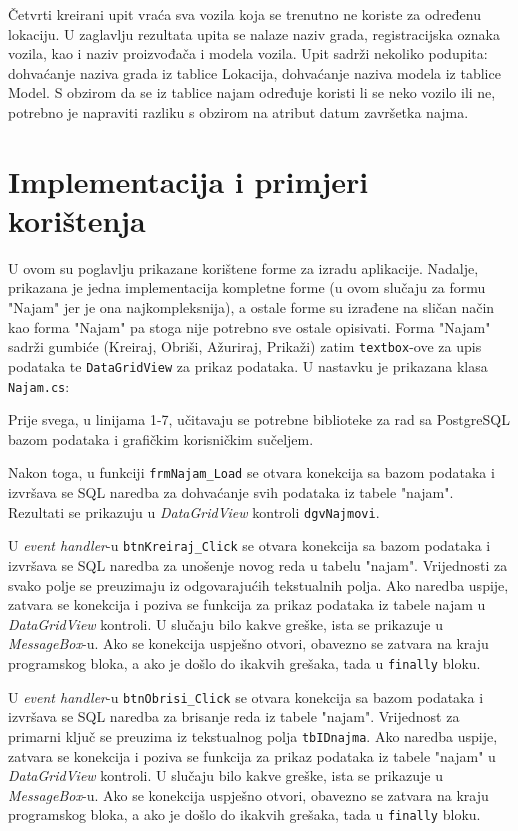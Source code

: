 \documentclass[]{foi} %
\begin{document}
Četvrti kreirani upit vraća sva vozila koja se trenutno ne koriste za određenu lokaciju. U zaglavlju rezultata upita se nalaze naziv grada, registracijska oznaka vozila, kao i naziv proizvođača i modela vozila. Upit sadrži nekoliko podupita: dohvaćanje naziva grada iz tablice Lokacija, dohvaćanje naziva modela iz tablice Model. S obzirom da se iz tablice najam određuje koristi li se neko vozilo ili ne, potrebno je napraviti razliku s obzirom na atribut datum završetka najma.

\chapter{Implementacija i primjeri korištenja}

U ovom su poglavlju prikazane korištene forme za izradu aplikacije. Nadalje, prikazana je jedna implementacija kompletne forme (u ovom slučaju za formu "Najam" jer je ona najkompleksnija), a ostale forme su izrađene na sličan način kao forma "Najam" pa stoga nije potrebno sve ostale opisivati. Forma "Najam" sadrži gumbiće (Kreiraj, Obriši, Ažuriraj, Prikaži) zatim \texttt{textbox}-ove za upis podataka te \texttt{DataGridView} za prikaz podataka. U nastavku je prikazana klasa \texttt{Najam.cs}:
\vspace{5mm}

Prije svega, u linijama 1-7, učitavaju se potrebne biblioteke za rad sa PostgreSQL bazom podataka i grafičkim korisničkim sučeljem.

Nakon toga, u funkciji \texttt{frmNajam\_Load} se otvara konekcija sa bazom podataka i izvršava se SQL naredba za dohvaćanje svih podataka iz tabele "najam". Rezultati se prikazuju u \textit{DataGridView} kontroli \texttt{dgvNajmovi}.

U \textit{event handler}-u \texttt{btnKreiraj\_Click} se otvara konekcija sa bazom podataka i izvršava se SQL naredba za unošenje novog reda u tabelu "najam". Vrijednosti za svako polje se preuzimaju iz odgovarajućih tekstualnih polja. Ako naredba uspije, zatvara se konekcija i poziva se funkcija za prikaz podataka iz tabele najam u \textit{DataGridView} kontroli. U slučaju bilo kakve greške, ista se prikazuje u \textit{MessageBox}-u. Ako se konekcija uspješno otvori, obavezno se zatvara na kraju programskog bloka, a ako je došlo do ikakvih grešaka, tada u \texttt{finally} bloku.

U \textit{event handler}-u \texttt{btnObrisi\_Click} se otvara konekcija sa bazom podataka i izvršava se SQL naredba za brisanje reda iz tabele "najam". Vrijednost za primarni ključ se preuzima iz tekstualnog polja \texttt{tbIDnajma}. Ako naredba uspije, zatvara se konekcija i poziva se funkcija za prikaz podataka iz tabele "najam" u \textit{DataGridView} kontroli. U slučaju bilo kakve greške, ista se prikazuje u \textit{MessageBox}-u. Ako se konekcija uspješno otvori, obavezno se zatvara na kraju programskog bloka, a ako je došlo do ikakvih grešaka, tada u \texttt{finally} bloku.
\end{document}
